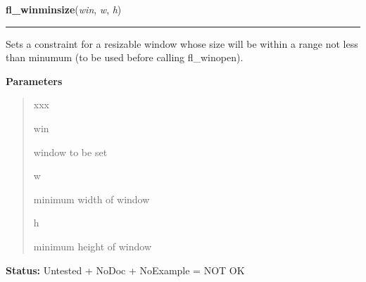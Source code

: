 \hspace{.8\funcindent}\begin{boxedminipage}{\funcwidth}

    \raggedright \textbf{fl\_winminsize}(\textit{win}, \textit{w}, \textit{h})

    \vspace{-1.5ex}

    \rule{\textwidth}{0.5\fboxrule}
\setlength{\parskip}{2ex}
    Sets a constraint for a resizable window whose size will be within a 
    range not less than minumum (to be used before calling fl\_winopen).

\setlength{\parskip}{1ex}
      \textbf{Parameters}
      \vspace{-1ex}

      \begin{quote}
        \begin{Ventry}{xxx}

          \item[win]

          window to be set

          \item[w]

          minimum width of window

          \item[h]

          minimum height of window

        \end{Ventry}

      \end{quote}

\textbf{Status:} Untested + NoDoc + NoExample = NOT OK



    \end{boxedminipage}

    \label{xformslib:library:fl_winmaxsize}

    \vspace{0.5ex}

